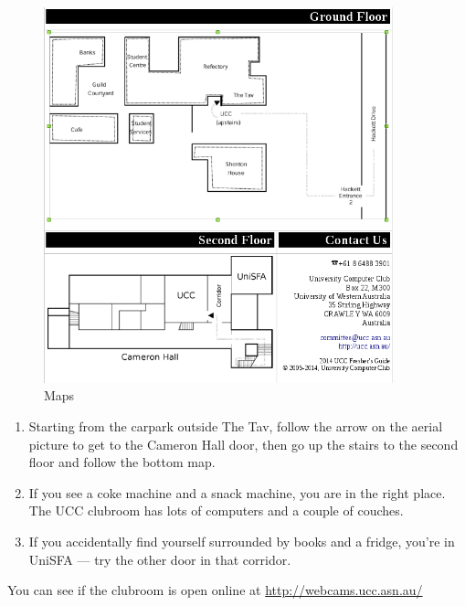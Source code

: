 \label{FindClubroom}





\begin{figure}[H]
	\centering
	\includegraphics[width=0.9\textwidth]{figures/maps.png}
	\caption{Maps} 
	\label{maps.png}
\end{figure}

\small{
\begin{mdframed}
\begin{enumerate}
	\item Starting from the carpark outside The Tav, follow the arrow on the aerial picture to get to the Cameron Hall door, then go up the stairs to the second floor and follow the bottom map.
	\item If you see a coke machine and a snack machine, you are in the right place. The UCC clubroom has lots of computers and a couple of couches.
	\item If you accidentally find yourself surrounded by books and a fridge, you're in UniSFA --- try the other door in that corridor.
\end{enumerate}

You can see if the clubroom is open online at \url{http://webcams.ucc.asn.au/}

\end{mdframed}}

